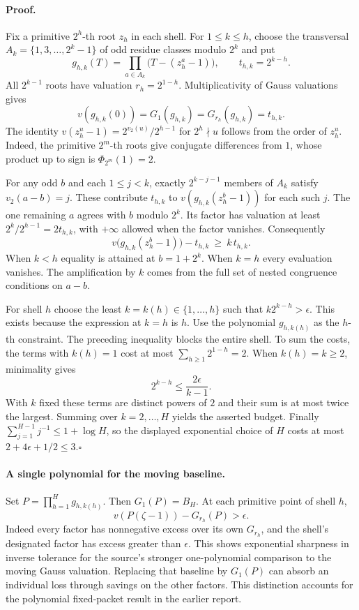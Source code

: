 \paragraph{Proof.}
Fix a primitive $2^h$-th root $z_h$ in each shell. For $1\le k\le h$, choose the transversal $A_k=\{1,3,\ldots,2^k-1\}$ of odd residue classes modulo $2^k$ and put
\[
 g_{h,k}(T)=\prod_{a\in A_k}\big(T-(z_h^a-1)\big),
 \qquad t_{h,k}=2^{k-h}.
\]
All $2^{k-1}$ roots have valuation $r_h=2^{1-h}$. Multiplicativity of Gauss valuations gives
\[
 v(g_{h,k}(0))=G_1(g_{h,k})=G_{r_h}(g_{h,k})=t_{h,k}.
\]
The identity $v(z_h^u-1)=2^{v_2(u)}/2^{h-1}$ for $2^h\nmid u$ follows from the order of $z_h^u$. Indeed, the primitive $2^m$-th roots give conjugate differences from $1$, whose product up to sign is $\Phi_{2^m}(1)=2$.

For any odd $b$ and each $1\le j<k$, exactly $2^{k-j-1}$ members of $A_k$ satisfy $v_2(a-b)=j$. These contribute $t_{h,k}$ to $v(g_{h,k}(z_h^b-1))$ for each such $j$. The one remaining $a$ agrees with $b$ modulo $2^k$. Its factor has valuation at least $2^k/2^{h-1}=2t_{h,k}$, with $+\infty$ allowed when the factor vanishes. Consequently
\[
 v\big(g_{h,k}(z_h^b-1)\big)-t_{h,k}\ \ge\ k\,t_{h,k}.
\]
When $k<h$ equality is attained at $b=1+2^k$. When $k=h$ every evaluation vanishes. The amplification by $k$ comes from the full set of nested congruence conditions on $a-b$.

For shell $h$ choose the least $k=k(h)\in\{1,\ldots,h\}$ such that $k2^{k-h}>\epsilon$. This exists because the expression at $k=h$ is $h$. Use the polynomial $g_{h,k(h)}$ as the $h$-th constraint. The preceding inequality blocks the entire shell. To sum the costs, the terms with $k(h)=1$ cost at most $\sum_{h\ge1}2^{1-h}=2$. When $k(h)=k\ge2$, minimality gives
\[
 2^{k-h}\le\frac{2\epsilon}{k-1}.
\]
With $k$ fixed these terms are distinct powers of $2$ and their sum is at most twice the largest. Summing over $k=2,\ldots,H$ yields the asserted budget. Finally $\sum_{j=1}^{H-1}j^{-1}\le1+\log H$, so the displayed exponential choice of $H$ costs at most $2+4\epsilon+1/2\le3$.\hfill$\square$

\paragraph{A single polynomial for the moving baseline.}
Set $P=\prod_{h=1}^H g_{h,k(h)}$. Then $G_1(P)=B_H$. At each primitive point of shell $h$,
\[
 v(P(\zeta-1))-G_{r_h}(P)>\epsilon.
\]
Indeed every factor has nonnegative excess over its own $G_{r_h}$, and the shell's designated factor has excess greater than $\epsilon$. This shows exponential sharpness in inverse tolerance for the source's stronger one-polynomial comparison to the moving Gauss valuation. Replacing that baseline by $G_1(P)$ can absorb an individual loss through savings on the other factors. This distinction accounts for the polynomial fixed-packet result in the earlier report.

